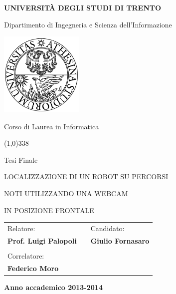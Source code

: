 
\thispagestyle{empty}

\begin{center}
	 {\bfseries\Large {\huge U}NIVERSIT\`A DEGLI STUDI DI {\huge T}RENTO}

	\vspace{0.2cm}

	{\large Dipartimento di Ingegneria e Scienza dell'Informazione}

	\vspace{0.5cm}

	\begin{center}
		\includegraphics[width=0.3\textwidth]{img/unitn}
	\end{center}

	\vspace{0.5cm}

	{\Large Corso di Laurea in Informatica}

	\vspace{0.2cm}
	\line(1,0){338}
	\vspace{0.5cm}

	{\Large Tesi Finale}

	\vspace{1.5cm}

	{\Large {LOCALIZZAZIONE DI UN ROBOT SU PERCORSI }} %

	\vspace{0.2cm}

	{\Large {NOTI UTILIZZANDO UNA WEBCAM }}

	\vspace{0.2cm}

	{\Large {IN POSIZIONE FRONTALE }}

	\vspace{1.5cm}

	\large
	\begin{center}
		\begin{tabular}{lcl}
			Relatore: & \hspace{5cm} &  Candidato: \\
			{\bfseries Prof. Luigi Palopoli} & \hspace{5cm} & {\bfseries Giulio Fornasaro} \\ \\
			Correlatore: \\ {\bfseries Federico Moro}
		\end{tabular}
	\end{center}
	\vspace{2.0cm}

	{\large \bfseries Anno accademico 2013-2014}
	\vfill

\end{center}
